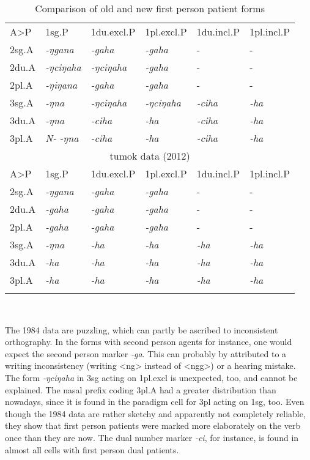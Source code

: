 \begin{table}[htp]
\begin{tabular}{llllll}
\lsptoprule
\multicolumn{6}{c}{{\sc omruwa data (1984)}} \\
\midrule
	A>P			& {\sc 1sg.P}		&{\sc 1du.excl.P} &{\sc 1pl.excl.P}		&{\sc 1du.incl.P} &{\sc 1pl.incl.P}	\\
\midrule                                                                    
{\sc 2sg.A}&\emph{-ŋgana}	&\emph{-gaha}	&\emph{-gaha}			 & -					 &-						\\
{\sc 2du.A}&\emph{-ŋciŋaha}	&\emph{-ŋciŋaha} &\emph{-gaha}			 & -					 &-						\\
{\sc 2pl.A}&\emph{-ŋiŋana}	&\emph{-gaha}	&\emph{-gaha}			  & -					&-						\\
{\sc 3sg.A}&\emph{-ŋna}		&\emph{-ŋciŋaha}	 &\emph{-ŋciŋaha}	&  \emph{-ciha}& \emph{-ha}		\\
{\sc 3du.A}&\emph{-ŋna}		&\emph{-ciha}	&\emph{-ha}				&  \emph{-ciha}& \emph{-ha}		\\
{\sc 3pl.A}&\emph{N- -ŋna}	&\emph{-ciha}	&\emph{-ha}			&	  \emph{-ciha}& \emph{-ha}	\\
\midrule
\multicolumn{6}{c}{{\sc tumok data (2012)}} \\
\midrule
	A>P			& {\sc 1sg.P}&		{\sc 1du.excl.P}&{\sc 1pl.excl.P}	& {\sc 1du.incl.P} &{\sc 1pl.incl.P}	\\
\midrule                                                             
{\sc 2sg.A}&\emph{-ŋgana}	&\emph{-gaha	}	&\emph{-gaha}		&-					&-						\\
{\sc 2du.A}&\emph{-gaha}		&\emph{-gaha	}	&\emph{-gaha}		&-					&-						\\
{\sc 2pl.A}&\emph{-gaha}		&\emph{-gaha	}	&\emph{-gaha}		&-					&-						\\
{\sc 3sg.A}&\emph{-ŋna}		&\emph{-ha}	&\emph{-ha}			&\emph{-ha}	&\emph{-ha}	\\
{\sc 3du.A}&\emph{-ha}			&\emph{-ha}	&\emph{-ha}			&\emph{-ha}	&\emph{-ha}	\\
{\sc 3pl.A}&\emph{-ha}			&\emph{-ha}	&\emph{-ha}			&\emph{-ha}	&\emph{-ha}	\\
\lspbottomrule
\end{tabular}\\
\caption{Comparison of old and new first person patient forms}\label{omruwa}
\end{table}

The 1984 data are puzzling, which can partly be ascribed to inconsistent orthography. In the forms with second person agents for instance, one would expect the second person marker \emph{-ga}. This can probably by attributed to a writing inconsistency (writing <ng> instead of <ngg>) or a hearing mistake. The form \emph{-ŋciŋaha} in {\sc 3sg} acting on {\sc 1pl.excl} is unexpected, too, and cannot be explained. The nasal prefix coding {\sc 3pl.A} had a greater distribution than nowadays, since it is found in the paradigm cell for {\sc 3pl} acting on {\sc 1sg}, too. Even though the 1984 data are rather sketchy and apparently not completely reliable, they show that first person patients were marked more elaborately on the verb once than they are now. The dual number marker \emph{-ci}, for instance, is found in almost all cells with first person dual patients. 

